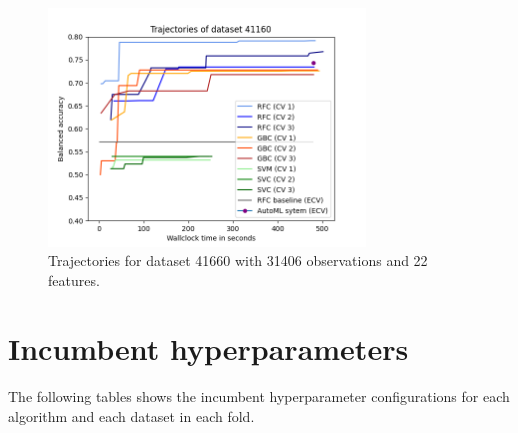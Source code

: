 \documentclass[11pt]{article}
\begin{document}
\begin{figure}[H]
 \centering
  \includegraphics[width=0.75\textwidth]{fig/plot_dataset_41160.png}
  \caption{Trajectories for dataset 41660 with 31406 observations and 22 features.}
\end{figure}

\section{Incumbent hyperparameters}

The following tables shows the incumbent hyperparameter configurations for each algorithm and each dataset in each fold. 
\end{document}
